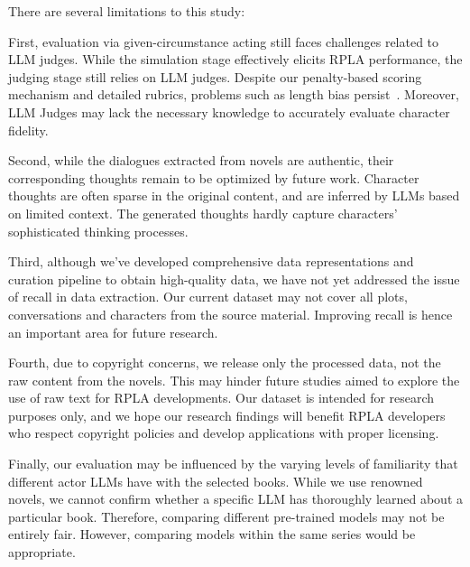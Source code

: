 There are several limitations to this study:

First, evaluation via given-circumstance acting 
still faces challenges related to LLM judges. 
While the simulation stage effectively elicits RPLA performance, the judging stage still relies on LLM judges. 
Despite our penalty-based scoring mechanism and detailed rubrics, problems such as length bias persist~\citep{}. Moreover, LLM Judges may lack the necessary knowledge to accurately evaluate character fidelity.


Second, while the dialogues extracted from novels are authentic, their corresponding thoughts remain to be optimized by future work. 
Character thoughts are often sparse in the original content, and are inferred by LLMs based on limited context. 
The generated thoughts hardly capture characters' sophisticated thinking processes. 

Third, although we’ve developed comprehensive data representations and curation pipeline to obtain high-quality data, we have not yet addressed the issue of recall in data extraction. 
Our current dataset may not cover all plots, conversations and characters from the source material. Improving recall is hence an important area for future research.

Fourth, due to copyright concerns, we release only the processed data, not the raw content from the novels. 
This may hinder future studies aimed to explore the use of raw text for RPLA developments. 
Our dataset is intended for research purposes only, and we hope our research findings will benefit RPLA developers who respect copyright policies and develop applications with proper licensing. 


Finally, our evaluation may be influenced by the varying levels of familiarity that different actor LLMs have with the selected books. 
While we use renowned novels, we cannot confirm whether a specific LLM has thoroughly learned about a particular book. 
Therefore, comparing different pre-trained models may not be entirely fair. However, comparing models within the same series would be appropriate.
